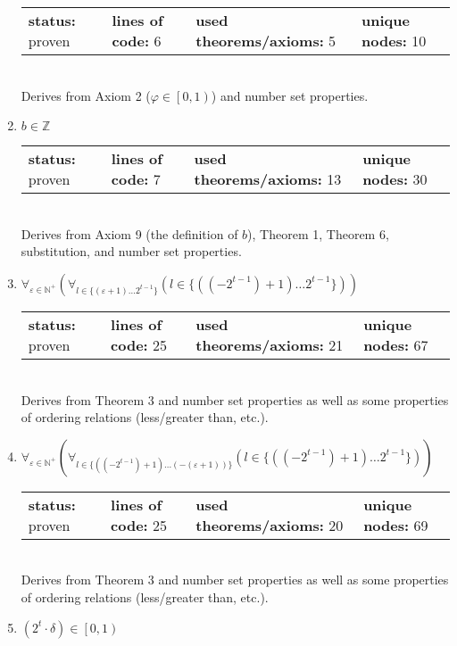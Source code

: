 \documentclass{article}[12pt]
\begin{document}
\begin{enumerate}
  \begin{tabular}{l | l | l | l}
    \textbf{status:} proven & \textbf{lines of code:} 6 & \textbf{used theorems/axioms:} 5 & \textbf{unique nodes:} 10
  \end{tabular} \hfill \\
  Derives from Axiom 2 ($\varphi \in \left[0,1\right)$) and number set properties.
\item $b \in \mathbb{Z}$ \hfill \\
  \begin{tabular}{l | l | l | l}
    \textbf{status:} proven & \textbf{lines of code:} 7 & \textbf{used theorems/axioms:} 13 & \textbf{unique nodes:} 30
  \end{tabular} \hfill \\
  Derives from Axiom 9 (the definition of $b$), Theorem 1, Theorem 6, substitution, and number set properties.
\item $\forall_{\varepsilon \in \mathbb{N}^+} \left(\forall_{l \in \{\left(\varepsilon + 1\right)\ldots 2^{t - 1}\}} \left(l \in \{\left(\left(-2^{t - 1}\right) + 1\right)\ldots 2^{t - 1}\}\right)\right)$ \hfill \\
  \begin{tabular}{l | l | l | l}
    \textbf{status:} proven & \textbf{lines of code:} 25 & \textbf{used theorems/axioms:} 21 & \textbf{unique nodes:} 67
  \end{tabular} \hfill \\
Derives from Theorem 3 and number set properties as well as some properties of ordering relations (less/greater than, etc.).
\item $\forall_{\varepsilon \in \mathbb{N}^+} \left(\forall_{l \in \{\left(\left(-2^{t - 1}\right) + 1\right)\ldots \left(-\left(\varepsilon + 1\right)\right)\}} \left(l \in \{\left(\left(-2^{t - 1}\right) + 1\right)\ldots 2^{t - 1}\}\right)\right)$ \hfill \\
  \begin{tabular}{l | l | l | l}
    \textbf{status:} proven & \textbf{lines of code:} 25 & \textbf{used theorems/axioms:} 20 & \textbf{unique nodes:} 69
  \end{tabular} \hfill \\
Derives from Theorem 3 and number set properties as well as some properties of ordering relations (less/greater than, etc.).
\item $\left(2^{t} \cdot \delta\right) \in \left[0,1\right)$ \hfill \\
  \begin{tabular}{l | l | l | l}

\end{tabular}
\end{enumerate}
\end{document}
